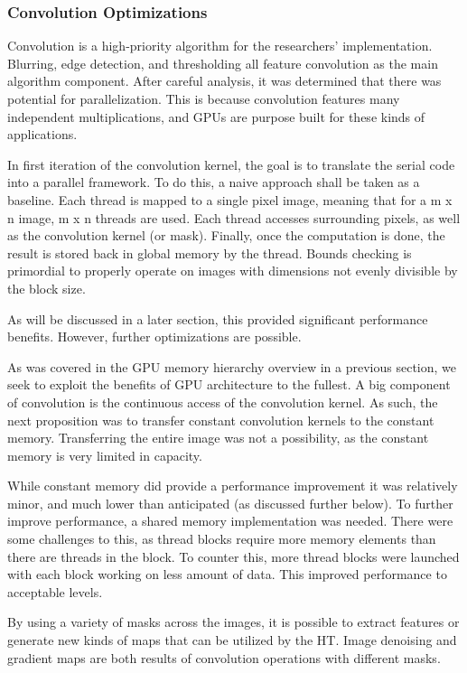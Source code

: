 \documentclass[conference]{IEEEtran}
\begin{document}
\subsubsection*{Convolution Optimizations}
Convolution is a high-priority algorithm for the researchers' implementation. Blurring, edge detection, and thresholding all feature convolution as the main algorithm component. After careful analysis, it was determined that there was potential  for parallelization. This is because convolution features many independent multiplications, and GPUs are purpose built for these kinds of applications.

In first iteration of the convolution kernel, the goal is to translate the serial code into a parallel framework. To do this, a naive approach shall be taken as a baseline. Each thread is mapped to a single pixel image, meaning that for a m x n image, m x n threads are used. Each thread accesses surrounding pixels, as well as the convolution kernel (or mask). Finally, once the computation is done, the result is stored back in global memory by the thread. Bounds checking is primordial to properly operate on images with dimensions not evenly divisible by the block size.

As will be discussed in a later section, this provided significant performance benefits. However, further optimizations are possible.

As was covered in the GPU memory hierarchy overview in a previous section, we seek to exploit the benefits of GPU architecture to the fullest. A big component of convolution is the continuous access of the convolution kernel. As such, the next proposition was to transfer constant convolution kernels to the constant memory. Transferring the entire image was not a possibility, as the constant memory is very limited in capacity.

While constant memory did provide a performance improvement it was relatively minor, and much lower than anticipated (as discussed further 
 below). To further improve performance,  a shared memory implementation was needed. There were some challenges to this, as thread blocks require more memory elements than there are threads in the block. To counter this, more thread blocks were launched with each block working on less amount of data. This improved performance to acceptable levels.


By using a variety of masks across the images, it is possible to extract features or generate new kinds of maps that can be utilized by the HT\@.
Image denoising and gradient maps are both results of convolution operations with different masks.
\end{document}
